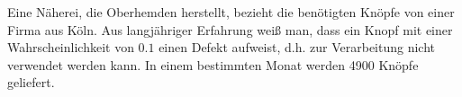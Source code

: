 \documentclass{abgabe}
\begin{document}
\begin{questions}
    \question
    Eine Näherei, die Oberhemden herstellt, bezieht die benötigten Knöpfe von einer Firma aus Köln. 
    Aus langjähriger Erfahrung weiß man, dass ein Knopf mit einer Wahrscheinlichkeit von $0.1$ einen Defekt aufweist, d.h. zur Verarbeitung nicht verwendet werden kann. 
    In einem bestimmten Monat werden \num{4900} Knöpfe geliefert.
\end{questions}
\end{document}
